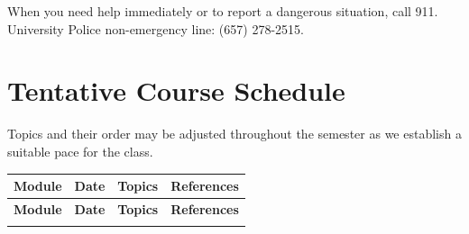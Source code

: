 \documentclass{./../latex/syllabus}
\begin{document}
\vspace{0.5em}
\noindent When you need help immediately or to report a dangerous situation, call 911. University Police non-emergency line: (657) 278-2515.

\clearpage
{}
\section*{Tentative Course Schedule}

Topics and their order may be adjusted throughout the semester as we establish a suitable pace for the class.

{\footnotesize{}\renewcommand{\arraystretch}{1.35}
\begin{xltabular}{\textwidth}{@{}>{\raggedright\arraybackslash}p{3.0cm} l X >{\raggedright\arraybackslash}p{2.9cm}@{}}
\hline
\textbf{Module} & \textbf{Date} & \textbf{Topics} & \textbf{References} \\
\hline
\endfirsthead
\hline
\textbf{Module} & \textbf{Date} & \textbf{Topics} & \textbf{References} \\
\hline
\endhead
\hline
\endlastfoot

\end{xltabular}
}
\restoregeometry

\end{document}
